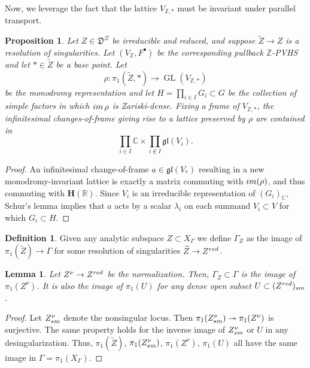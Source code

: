 \documentclass[10pt,letterpaper,english,reqno]{amsart}
\numberwithin{equation}{subsection}
\newcommand\fD{{\mathfrak D}}
\newcommand\C{{\mathbb C}}
\newcommand\R{{\mathbb R}}
\newcommand\Z{{\mathbb Z}}
\newcommand\wZ{{\widetilde Z}}
\newcommand\bfH{{\mathbf H}}
\DeclareMathOperator{\GL}{GL}
\newcommand\onto{\twoheadrightarrow}
\newtheorem{lemma}[theorem]{Lemma}
\newtheorem{proposition}[theorem]{Proposition}
\theoremstyle{definition}
\newtheorem{definition}[theorem]{Definition}
\begin{document}
Now, we leverage the fact that the lattice $V_{\Z,*}$
must be invariant under parallel transport.

\begin{proposition}\label{scale-factors}
Let $Z\in \fD^{\Xi}$ be irreducible and 
reduced, and suppose $\wZ\to Z$ is a resolution of 
singularities. Let $(V_\Z,F^\bullet)$ be the corresponding
pullback $\Z$-PVHS and let $*\in \wZ$ be a base point. 
Let $$\rho\colon \pi_1(\wZ,*)\to \GL(V_{\Z,*})$$
be the monodromy representation and let
$H=\prod_{i\in I} G_i\subset G$ be the collection of simple
factors in which
${\rm im}\,\rho$ is Zariski-dense. Fixing a frame of $V_{\Z,*}$,
the infinitesimal changes-of-frame giving rise to a lattice 
preserved by $\rho$ are contained in 
$$\prod_{i\in I}\C\times \prod_{i\notin I}\mathfrak{gl}(V_i).$$
\end{proposition}

\begin{proof} An infinitesimal change-of-frame $a\in \mathfrak{gl}(V_*)$ resulting in a new monodromy-invariant
lattice is exactly a matrix commuting with ${\rm im}(\rho)$,
and thus commuting with $\bfH(\R)$.
Since $V_i$ is an irreducible representation
of $(G_i)_\C$, Schur's lemma
implies that $a$ acts by
a scalar $\lambda_i$ on each summand $V_i\subset V$
for which $G_i\subset H$.
\end{proof}

\begin{definition} Given any analytic subspace
$Z\subset X_\Gamma$ we define
$\Gamma_Z$ as the image of $\pi_1(\wZ)\to \Gamma$ for some resolution of singularities $\wZ\to Z^{\rm red}$.\end{definition}

\begin{lemma}\label{normal2} Let $Z^\nu\to Z^{\rm red}$ be the
normalization. Then, $\Gamma_Z\subset \Gamma$ is the image
of $\pi_1(Z^\nu)$. It is also the image of $\pi_1(U)$
for any dense open subset $U\subset (Z^{\rm red})_{\rm sm}$. \end{lemma}

\begin{proof} Let $Z^\nu_{\rm sm}$ denote
the nonsingular locus. Then
$\pi_1(Z^\nu_{\rm sm})\onto \pi_1(Z^\nu)$
is surjective. The same property holds
for the inverse image of $Z_{\rm sm}^\nu$
or $U$ in any desingularization. Thus,
$\pi_1(\wZ)$, $\pi_1(Z^\nu_{\rm sm})$, $\pi_1(Z^\nu)$,
$\pi_1(U)$
all have the same image in $\Gamma=\pi_1(X_\Gamma)$. \end{proof}
\end{document}
